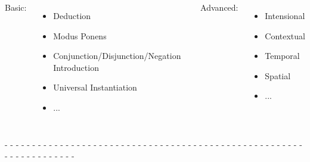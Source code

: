 \documentclass[aspectratio=169]{beamer}
\begin{document}
\begin{frame}



  \begin{columns}
    \column{4in}
    
    Basic:
    \begin{itemize}
    \item Deduction
    \item Modus Ponens
    \item Conjunction/Disjunction/Negation Introduction
    \item Universal Instantiation
    \item ...
    \end{itemize}
    
    \column{2in}
    
    Advanced:
    \begin{itemize}
    \item Intensional
    \item Contextual
    \item Temporal
    \item Spatial
    \item ...
    \end{itemize}
    
  \end{columns}


  - - - - - - - - - - - - - - - - - - - - - - - - - - - - - - - - - -
  - - - - - - - - - - - - - - - - - - - - - - - - - - - - - - - - -\\[0.1cm]

\end{frame}
\end{document}
